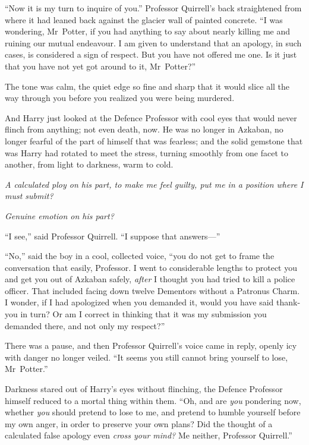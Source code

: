 “Now it is my turn to inquire of you.” Professor Quirrell’s back straightened from where it had leaned back against the glacier wall of painted concrete. “I was wondering, Mr~Potter, if you had anything to say about nearly killing me and ruining our mutual endeavour. I am given to understand that an apology, in such cases, is considered a sign of respect. But you have not offered me one. Is it just that you have not yet got around to it, Mr~Potter?”

The tone was calm, the quiet edge so fine and sharp that it would slice all the way through you before you realized you were being murdered.

And Harry just looked at the Defence Professor with cool eyes that would never flinch from anything; not even death, now. He was no longer in Azkaban, no longer fearful of the part of himself that was fearless; and the solid gemstone that was Harry had rotated to meet the stress, turning smoothly from one facet to another, from light to darkness, warm to cold.

\emph{A calculated ploy on his part, to make me feel guilty, put me in a position where I must submit?}

\emph{Genuine emotion on his part?}

“I see,” said Professor Quirrell. “I suppose that answers—”

“No,” said the boy in a cool, collected voice, “you do not get to frame the conversation that easily, Professor. I went to considerable lengths to protect you and get you out of Azkaban safely, \emph{after} I thought you had tried to kill a police officer. That included facing down twelve Dementors without a Patronus Charm. I wonder, if I had apologized when you demanded it, would you have said thank-you in turn? Or am I correct in thinking that it was my submission you demanded there, and not only my respect?”

There was a pause, and then Professor Quirrell’s voice came in reply, openly icy with danger no longer veiled. “It seems you still cannot bring yourself to lose, Mr~Potter.”

Darkness stared out of Harry’s eyes without flinching, the Defence Professor himself reduced to a mortal thing within them. “Oh, and are \emph{you} pondering now, whether \emph{you} should pretend to lose to me, and pretend to humble yourself before my own anger, in order to preserve your own plans? Did the thought of a calculated false apology even \emph{cross your mind?} Me neither, Professor Quirrell.”


